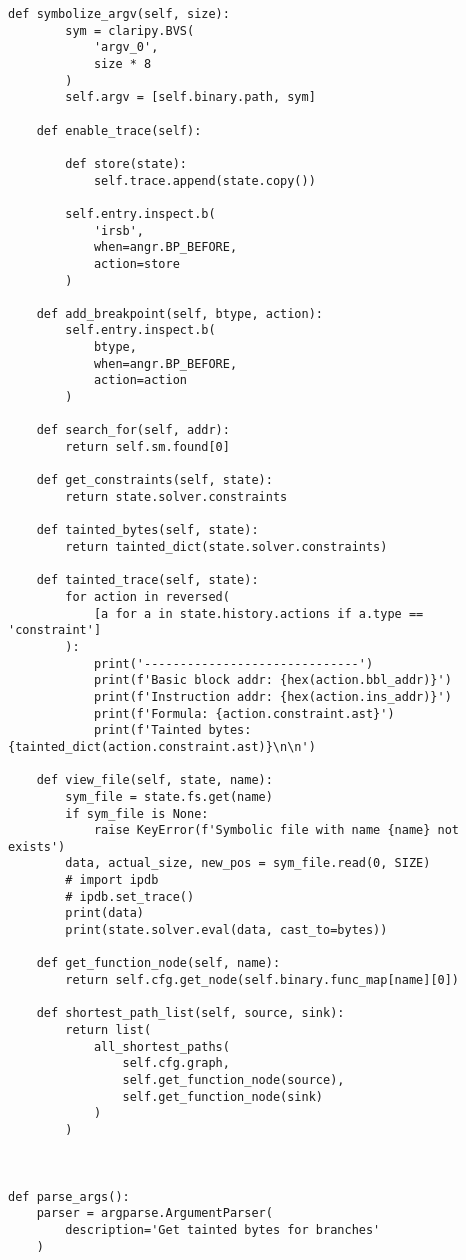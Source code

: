 \begin{lstlisting}[environoment=py_code, caption=taint\_influence.py, captionpos=b]
    def symbolize_argv(self, size):
        sym = claripy.BVS(
            'argv_0',
            size * 8
        )
        self.argv = [self.binary.path, sym]

    def enable_trace(self):

        def store(state):
            self.trace.append(state.copy())

        self.entry.inspect.b(
            'irsb',
            when=angr.BP_BEFORE,
            action=store
        )

    def add_breakpoint(self, btype, action):
        self.entry.inspect.b(
            btype,
            when=angr.BP_BEFORE,
            action=action
        )

    def search_for(self, addr):
        return self.sm.found[0]
        
    def get_constraints(self, state):
        return state.solver.constraints

    def tainted_bytes(self, state):
        return tainted_dict(state.solver.constraints)

    def tainted_trace(self, state):
        for action in reversed(
            [a for a in state.history.actions if a.type == 'constraint']
        ):
            print('------------------------------')
            print(f'Basic block addr: {hex(action.bbl_addr)}')
            print(f'Instruction addr: {hex(action.ins_addr)}')
            print(f'Formula: {action.constraint.ast}')
            print(f'Tainted bytes: {tainted_dict(action.constraint.ast)}\n\n')

    def view_file(self, state, name):
        sym_file = state.fs.get(name)
        if sym_file is None:
            raise KeyError(f'Symbolic file with name {name} not exists')
        data, actual_size, new_pos = sym_file.read(0, SIZE)
        # import ipdb
        # ipdb.set_trace()
        print(data)
        print(state.solver.eval(data, cast_to=bytes))

    def get_function_node(self, name):
        return self.cfg.get_node(self.binary.func_map[name][0])

    def shortest_path_list(self, source, sink):
        return list(
            all_shortest_paths(
                self.cfg.graph,
                self.get_function_node(source),
                self.get_function_node(sink)
            )
        )



def parse_args():
    parser = argparse.ArgumentParser(
        description='Get tainted bytes for branches'
    )


\end{lstlisting}
